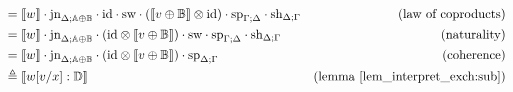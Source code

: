 \documentclass[10pt,a4paper]{amsart}
\theoremstyle{definition}
\theoremstyle{definition}
\theoremstyle{definition}
\theoremstyle{definition}
\theoremstyle{definition}
\theoremstyle{definition}
\begin{document}
\begin{align*}
  & = \llbracket w \rrbracket \cdot \text{jn}_{\Delta;\mathbb{A} \oplus \mathbb{B}} \cdot  \text{id} \cdot \text{sw}  \cdot (\llbracket v \oplus \mathbb{B}\rrbracket \otimes \text{id})  \cdot  \text{sp}_{\Gamma;\Delta} \cdot \text{sh}_{\Delta;\Gamma}  & {\text{(law of coproducts)}}\\
  & = \llbracket w \rrbracket \cdot \text{jn}_{\Delta;\mathbb{A} \oplus \mathbb{B}} \cdot ( \text{id} \otimes \llbracket v \oplus \mathbb{B}\rrbracket )  \cdot  \text{sw}  \cdot  \text{sp}_{\Gamma;\Delta} \cdot \text{sh}_{\Delta;\Gamma}  & {\text{(naturality)}}\\
  &  = \llbracket w \rrbracket \cdot \text{jn}_{\Delta;\mathbb{A} \oplus \mathbb{B}} \cdot ( \text{id} \otimes \llbracket v \oplus \mathbb{B}\rrbracket )  \cdot  \text{sp}_{\Delta; \Gamma} & {\text{(coherence)}}\\
  & \triangleq \llbracket w[v/x] : \mathbb{D} \rrbracket & {\text{(lemma \ref{lem_interpret_exch:sub})}}
\end{align*}

\newpage
 

\end{document}
